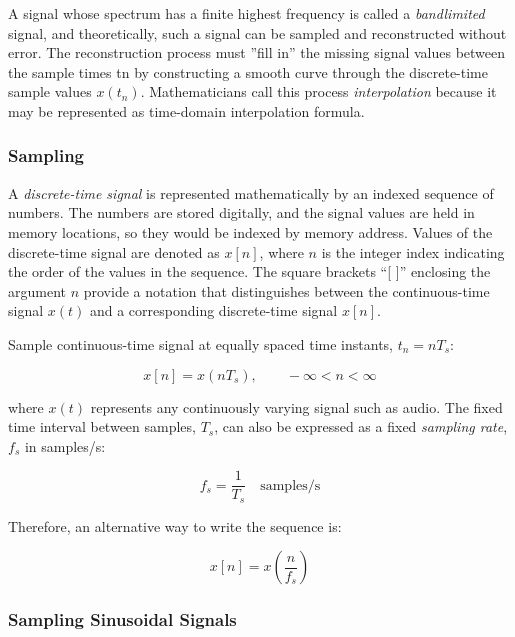 \documentclass[11pt]{article}
\begin{document}
A signal whose spectrum has a finite highest frequency is called a
\textit{bandlimited} signal, and theoretically, such a signal can be sampled and
reconstructed without error. The reconstruction process must ''fill in'' the
missing signal values between the sample times tn by constructing a smooth curve
through the discrete-time sample values $x(t_n)$. Mathematicians call this
process \textit{interpolation} because it may be represented as time-domain
interpolation formula.

\subsubsection{Sampling}

A \emph{discrete-time signal} is represented mathematically by an indexed
sequence of numbers. The numbers are stored digitally, and the signal values are
held in memory locations, so they would be indexed by memory address. Values of
the discrete-time signal are denoted as $x[n]$, where $n$ is the integer index
indicating the order of the values in the sequence. The square brackets ``[ ]''
enclosing the argument $n$ provide a notation that distinguishes between the
continuous-time signal $x(t)$ and a corresponding discrete-time signal $x[n]$.

Sample continuous-time signal at equally spaced time instants, $t_n = nT_s$:

\begin{equation}
  x[n] = x(nT_s), \qquad -\infty < n < \infty
\end{equation}

where $x(t)$ represents any continuously varying signal such as audio. The fixed
time interval between samples, $T_s$, can also be expressed as a fixed
\emph{sampling rate}, $f_s$ in samples/s:

\begin{equation}
  f_s = \frac{1}{T_s} \quad \mathrm{samples/s}
\end{equation}

Therefore, an alternative way to write the sequence is:

\begin{equation}
  x[n] = x\left(\frac{n}{f_s}\right)
\end{equation}

\subsubsection{Sampling Sinusoidal Signals}
\end{document}
